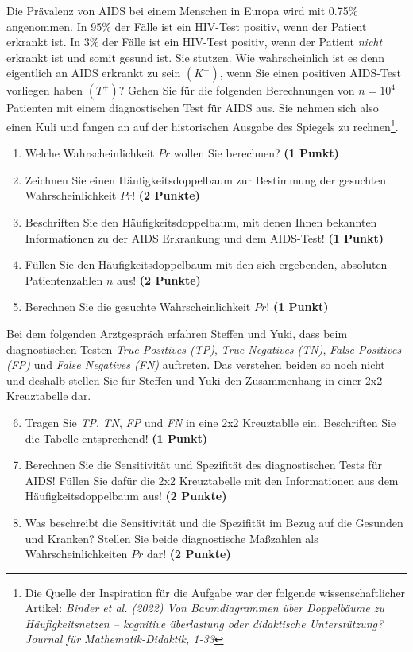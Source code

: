 \documentclass[a4paper, 9pt]{scrartcl}\usepackage[]{graphicx}\usepackage[]{xcolor}
\begin{document}
Die Prävalenz von AIDS bei einem Menschen in Europa wird mit 0.75\% angenommen. In 95\% der Fälle ist ein HIV-Test positiv, wenn der Patient erkrankt ist. In 3\% der Fälle ist ein HIV-Test positiv, wenn der Patient \textit{nicht} erkrankt ist und somit gesund ist. Sie stutzen. Wie wahrscheinlich ist es denn eigentlich an AIDS erkrankt zu sein $(K^+)$, wenn Sie einen positiven AIDS-Test vorliegen haben $(T^+)$? Gehen Sie für die folgenden Berechnungen von $n = \ensuremath{10^{4}}$ Patienten mit einem diagnostischen Test für AIDS aus. Sie nehmen sich also einen Kuli und fangen an auf der historischen Ausgabe des Spiegels zu rechnen\footnote{Die Quelle der Inspiration für die Aufgabe war der folgende wissenschaftlicher Artikel: \textit{Binder et al. (2022) Von Baumdiagrammen über Doppelbäume zu Häufigkeitsnetzen -- kognitive überlastung oder didaktische Unterstützung? Journal für Mathematik-Didaktik, 1-33}}.


\begin{enumerate}
\item Welche Wahrscheinlichkeit $Pr$ wollen Sie berechnen? \textbf{(1 Punkt)}
\item Zeichnen Sie einen Häufigkeitsdoppelbaum zur Bestimmung der gesuchten Wahrscheinlichkeit $Pr$! \textbf{(2 Punkte)} \item Beschriften Sie den Häufigkeitsdoppelbaum, mit denen Ihnen bekannten Informationen zu der AIDS Erkrankung und dem AIDS-Test! \textbf{(1 Punkt)}
\item Füllen Sie den Häufigkeitsdoppelbaum mit den sich ergebenden, absoluten Patientenzahlen $n$ aus! \textbf{(2 Punkte)}
\item Berechnen Sie die gesuchte Wahrscheinlichkeit $Pr$! \textbf{(1 Punkt)}
\end{enumerate}

Bei dem folgenden Arztgespräch erfahren Steffen und Yuki, dass beim diagnostischen Testen \textit{True Positives (TP)}, \textit{True Negatives (TN)}, \textit{False Positives (FP)} und \textit{False Negatives (FN)} auftreten. Das verstehen beiden so noch nicht und deshalb stellen Sie für Steffen und Yuki den Zusammenhang in einer 2x2 Kreuztabelle dar.

\begin{enumerate}
  \setcounter{enumi}{5}
\item Tragen Sie \textit{TP}, \textit{TN}, \textit{FP} und \textit{FN} in eine 2x2 Kreuztablle ein. Beschriften Sie die Tabelle entsprechend! \textbf{(1 Punkt)}
\item Berechnen Sie die Sensitivität und Spezifität des diagnostischen Tests für AIDS! Füllen Sie dafür die 2x2 Kreuztabelle mit den Informationen aus dem Häufigkeitsdoppelbaum aus! \textbf{(2 Punkte)}
\item Was beschreibt die Sensitivität und die Spezifität im Bezug auf die Gesunden und Kranken? Stellen Sie beide diagnostische Maßzahlen als Wahrscheinlichkeiten $Pr$ dar! \textbf{(2 Punkte)} 
\end{enumerate}
\end{document}
